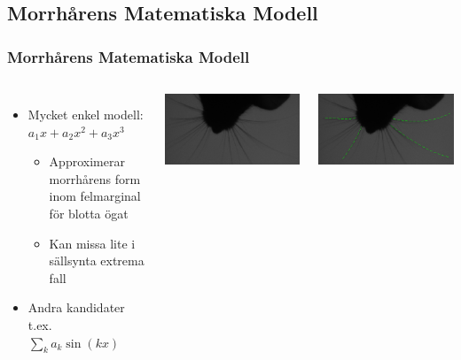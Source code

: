 \documentclass[]{beamer}
\renewcommand{\ae}{\"{a}}
\renewcommand{\oe}{\"{o}}
\begin{document}
\subsection{Morrh\aa rens Matematiska Modell}
\begin{frame}
  \frametitle{Morrh\aa rens Matematiska Modell}

  \begin{columns}[c]
    \column{3in}
    \begin{itemize}
    \item Mycket enkel modell: $a_1x + a_2x^2 + a_3x^3$
      \begin{itemize}
      \item Approximerar morrh\aa rens form inom felmarginal f\oe r blotta \oe gat
      \item Kan missa lite i s\ae llsynta extrema fall
      \end{itemize}
    \item Andra kandidater t.ex. $\sum\limits_k a_k\sin \left(kx\right)$
    \end{itemize}
    
    \column{1.5in}
    \includegraphics[width=1\textwidth]{rat-vanilla.png}

    \includegraphics[width=1\textwidth]{rat-splines.png}
  \end{columns}
\end{frame}
\end{document}
